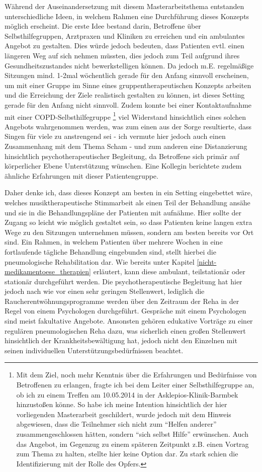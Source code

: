 Während der Auseinandersetzung mit diesem Masterarbeitsthema entstanden unterschiedliche Ideen, in welchem Rahmen eine Durchführung dieses Konzepts möglich erscheint.
Die erste Idee bestand darin, Betroffene über Selbsthilfegruppen, Arztpraxen und Kliniken zu erreichen und ein ambulantes Angebot zu gestalten. Dies würde jedoch bedeuten, dass Patienten evtl. einen längeren Weg auf sich nehmen müssten, dies jedoch zum Teil aufgrund ihres Gesundheitszustandes nicht bewerkstelligen können. Da jedoch m.E. regelmäßige Sitzungen mind. 1-2mal wöchentlich gerade für den Anfang sinnvoll erscheinen, um mit einer Gruppe im Sinne eines gruppentherapeutischen Konzepts arbeiten und die Erreichung der Ziele realistisch gestalten zu können, ist dieses Setting gerade für den Anfang nicht sinnvoll. Zudem konnte bei einer Kontaktaufnahme mit einer COPD-Selbsthilfegruppe \footnote{Mit dem Ziel, noch mehr Kenntnis über die Erfahrungen und Bedürfnisse von Betroffenen zu erlangen, fragte ich bei dem Leiter einer Selbsthilfegruppe an, ob ich zu einem Treffen am 10.05.2014 in der Asklepios-Klinik-Barmbek hinzustoßen könne. So habe ich meine Intention hinsichtlich der hier vorliegenden Masterarbeit geschildert, wurde jedoch mit dem Hinweis abgewiesen, dass die Teilnehmer sich nicht zum "`Helfen anderer"' zusammengeschlossen hätten, sondern "`sich selbst Hilfe"' erwünschen. Auch das Angebot, im Gegenzug zu einem späteren Zeitpunkt z.B. einen Vortrag zum Thema zu halten, stellte hier keine Option dar. Zu stark schien die Identifizierung mit der Rolle des Opfers.} viel Widerstand hinsichtlich eines solchen Angebots wahrgenommen werden, was zum einen aus der Sorge resultierte, dass Singen für viele zu anstrengend sei - ich vermute hier jedoch auch einen Zusammenhang mit dem Thema Scham - und zum anderen eine Distanzierung hinsichtlich psychotherapeutischer Begleitung, da Betroffene sich primär auf körperlicher Ebene Unterstützung wünschen. Eine Kollegin berichtete zudem ähnliche Erfahrungen mit dieser Patientengruppe. 

Daher denke ich, dass dieses Konzept am besten in ein Setting eingebettet wäre, welches musiktherapeutische Stimmarbeit als einen Teil der Behandlung ansähe und sie in die Behandlungspläne der Patienten mit aufnähme. Hier sollte der Zugang so leicht wie möglich gestaltet sein, so dass Patienten keine langen extra Wege zu den Sitzungen unternehmen müssen, sondern am besten bereits vor Ort sind. Ein Rahmen, in welchem Patienten über mehrere Wochen in eine fortlaufende tägliche Behandlung eingebunden sind, stellt hierbei die pneumologische Rehabilitation dar. Wie bereits unter Kapitel \ref{nicht-medikamentoese_therapien} erläutert, kann diese ambulant, teilstationär oder stationär durchgeführt werden. Die psychotherapeutische Begleitung hat hier jedoch nach wie vor einen sehr geringen Stellenwert, lediglich die Raucherentwöhnungsprogramme werden über den Zeitraum der Reha in der Regel von einem Psychologen durchgeführt. Gespräche mit einem Psychologen sind meist fakultative Angebote. Ansonsten gehören edukative Vorträge zu einer regulären pneumologischen Reha dazu, was sicherlich einen großen Stellenwert hinsichtlich der Krankheitsbewältigung hat, jedoch nicht den Einzelnen mit seinen individuellen Unterstützungsbedürfnissen beachtet. 


